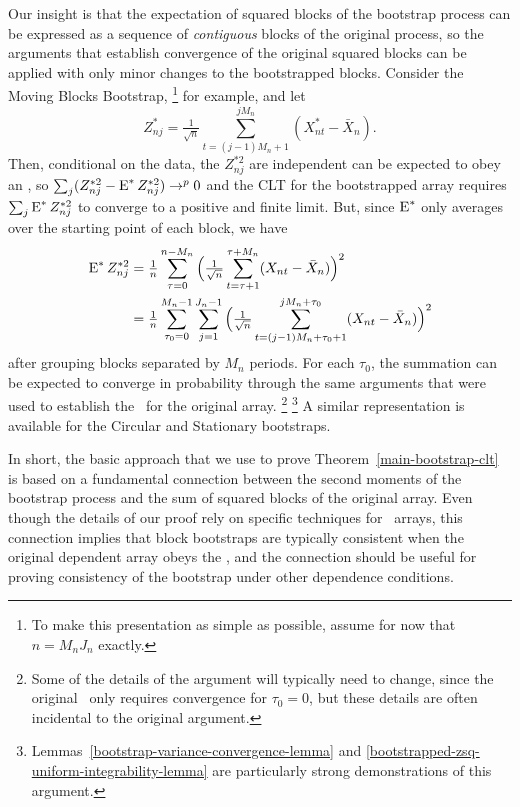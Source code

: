 \documentclass[11pt]{article}
\begin{document}
Our insight is that the expectation of squared blocks of the bootstrap
process can be expressed as a sequence of \emph{contiguous} blocks of
the original process, so the arguments that establish convergence of
the original squared blocks can be applied with only minor changes to
the bootstrapped blocks. Consider the Moving Blocks Bootstrap,%
\footnote{To make this presentation as simple as possible, assume for
  now that $n = M_n J_n$ exactly.} %
for example, and let
\begin{equation*}
  Z_{nj}^* = \tfrac{1}{\sqrt{n}} \sum_{t=(j-1) M_n + 1}^{j M_n} (X_{nt}^* - \bar X_n).
\end{equation*}
Then, conditional on the data, the $Z_{nj}^{*2}$ are independent can
be expected to obey an \lln, so %
$\sum_j (Z_{nj}^{*2} - \operatorname{E}^* Z_{nj}^{*2}) \to^p 0$ %
and the CLT for the bootstrapped array requires $\sum_j \operatorname{E}^*
Z_{nj}^{*2}$ to converge to a positive and finite limit.  But, since
$\operatorname{E}^*$ only averages over the starting point of each block, we have
\begin{align*}
  \operatorname{E}^* Z_{nj}^{*2} &=
  \tfrac{1}{n} \sum_{\tau = 0}^{n-M_n}
  \Big(\tfrac{1}{\sqrt{n}}
  \sum_{t= \tau + 1}^{\tau + M_n} (X_{nt} - \bar X_n) \Big)^2 \\
  &= \tfrac{1}{n} \sum_{\tau_0 = 0}^{M_n-1}
  \sum_{j=1}^{J_n-1}
  \Big(\tfrac{1}{\sqrt{n}}
  \sum_{t= (j - 1) M_n + \tau_0 + 1}^{j M_n + \tau_0} (X_{nt} - \bar X_n) \Big)^2
\end{align*}
after grouping blocks separated by $M_n$ periods. For each $\tau_0$,
the summation can be expected to converge in probability through the
same arguments that were used to establish the \clt\ for the original
array.%
\footnote{Some of the details of the argument will typically need to
  change, since the original \clt\ only requires convergence for
  $\tau_0 = 0$, but these details are often incidental to the original
  argument.}%
\footnote{Lemmas~\ref{bootstrap-variance-convergence-lemma} and
  \ref{bootstrapped-zsq-uniform-integrability-lemma} are particularly
  strong demonstrations of this argument.} %
A similar representation is available for the Circular and Stationary
bootstraps.

In short, the basic approach that we use to prove Theorem~\ref{main-bootstrap-clt}
is based on a fundamental connection between the second moments of the
bootstrap process and the sum of squared blocks of the original
array. Even though the details of our proof rely on specific
techniques for \ned\ arrays, this connection implies that block
bootstraps are typically consistent when the original dependent array
obeys the \clt, and the connection should be useful for proving
consistency of the bootstrap under other dependence conditions.
\end{document}
